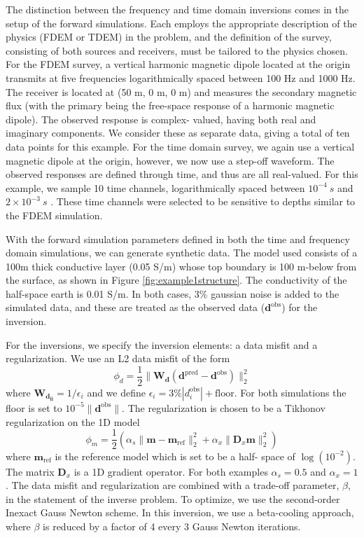 The distinction between the frequency and time domain inversions
comes in the setup of the forward simulations. Each employs the appropriate
description of the physics (FDEM or TDEM) in the problem, and the definition
of the survey, consisting of both sources and receivers, must be tailored to
the physics chosen. For the FDEM survey, a vertical harmonic magnetic dipole
located at the origin transmits at five frequencies logarithmically spaced
between 100 Hz and 1000 Hz. The receiver is located at (50 m, 0 m, 0 m)
and measures the secondary magnetic flux (with the primary being the free-space
response of a harmonic magnetic dipole). The observed response is complex-
valued, having both real and imaginary components. We consider these as
separate data, giving a total of ten data points for this example. For the
time domain survey, we again use a vertical magnetic dipole at the origin,
however, we now use a step-off waveform. The observed responses are defined
through time, and thus are all real-valued. For this example, we sample 10
time channels, logarithmically spaced between $10^{-4} ~s$ and $2\times10^{-3}
~ s$ . These time channels were selected to be sensitive to depths similar to
the FDEM simulation.

With the forward simulation parameters defined in both the time and frequency
domain simulations, we can generate synthetic data. The model used consists of
a 100m thick conductive layer (0.05 S/m) whose top boundary is 100 m-below
from the surface, as shown in Figure \ref{fig:example1structure}. The
conductivity of the half-space earth is 0.01 S/m. In both cases, 3\% gaussian
noise is added to the simulated data, and these are treated as the observed
data ($\mathbf{d}^{\text{obs}}$) for the inversion.

For the inversions, we specify the inversion elements: a data misfit and a
regularization. We use an L2 data misfit of the form
\begin{equation}
    \phi_d = \frac{1}{2}\|\mathbf{W_d}(\mathbf{d}^{\text{pred}} - \mathbf{d}^{\text{obs}})\|_2^2
    \label{eq:datamisfit}
\end{equation}
where $\mathbf{W_{d_{ii}}} = 1/\epsilon_i$ and we define $\epsilon_i = 3\% |d^{\text{obs}}_i| + \text{floor}$. For both simulations the floor is set to $10^{-5}\| \mathbf{d}^\text{obs}\|$. The regularization is chosen to be a Tikhonov regularization on the 1D model
\begin{equation}
    \phi_m = \frac{1}{2}\left(\alpha_s\|\mathbf{m}- \mathbf{m}_{\text{ref}} \|_2^2 + \alpha_x\| \mathbf{D}_x \mathbf{m}\|_2^2\right)
\end{equation}
where $\mathbf{m}_{\text{ref}}$ is the reference model which is set to be a half-
space of $\log(10^{-2})$. The matrix $\mathbf{D}_x$ is a 1D gradient
operator. For both examples $\alpha_s = 0.5$ and $\alpha_x = 1$. The data
misfit and regularization are combined with a trade-off parameter, $\beta$, in
the statement of the inverse problem. To optimize, we use the second-order
Inexact Gauss Newton scheme. In this inversion, we use a beta-cooling
approach, where $\beta$ is reduced by a factor of 4 every 3 Gauss Newton
iterations.

